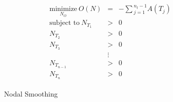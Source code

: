 \begin{eqnarray*}
\begin{array}{rcl}
\underset{N_O}{\text{minimize}} \ O(N) & = &
-\sum{_{j=1}^{n_t-1}A\left(T_j\right)} \\
\text{subject to} \ N_{T_1} & > & 0 \\
N_{T_2} & > & 0 \\ 
N_{T_3} & > & 0 \\
& \vdots & \\
N_{T_{n-1}} & > & 0 \\ 
N_{T_n} & > & 0
\end{array}
\end{eqnarray*}

\begin{figure}[h!]
  \caption{Nodal Smoothing}
\end{figure}



